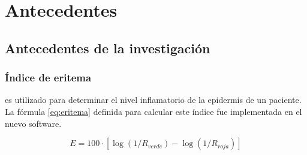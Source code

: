 \documentclass[conference]{IEEEtran}
\renewcommand{\arraystretch}{1.3}
\begin{document}
%



\section{Antecedentes}

	\subsection{Antecedentes de la investigaci\'{o}n}
		
		\subsubsection{\'{I}ndice de eritema}
		es utilizado para determinar el nivel inflamatorio de la epidermis de un paciente. La f\'{o}rmula \ref{eq:eritema} definida para calcular este \'{i}ndice \cite{Wagner} fue implementada en el nuevo software.
		
		\begin{equation}\label{eq:eritema}
			E = 100 \cdot [\log(1/R_{verde}) - \log(1/R_{roja})]
		\end{equation}
		
\end{document}
